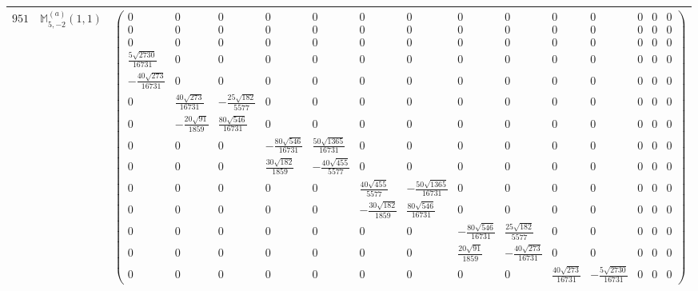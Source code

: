 \documentclass[fleqn,8pt,landscape]{jsarticle}
\begin{document}
\begin{center}
\begin{longtable}{ccc}
$ 951 $ & $ \mathbb{M}_{5,-2}^{(a)}(1,1) $ & $ \begin{pmatrix} 0 & 0 & 0 & 0 & 0 & 0 & 0 & 0 & 0 & 0 & 0 & 0 & 0 & 0 \\ 0 & 0 & 0 & 0 & 0 & 0 & 0 & 0 & 0 & 0 & 0 & 0 & 0 & 0 \\ 0 & 0 & 0 & 0 & 0 & 0 & 0 & 0 & 0 & 0 & 0 & 0 & 0 & 0 \\ \frac{5 \sqrt{2730}}{16731} & 0 & 0 & 0 & 0 & 0 & 0 & 0 & 0 & 0 & 0 & 0 & 0 & 0 \\ - \frac{40 \sqrt{273}}{16731} & 0 & 0 & 0 & 0 & 0 & 0 & 0 & 0 & 0 & 0 & 0 & 0 & 0 \\ 0 & \frac{40 \sqrt{273}}{16731} & - \frac{25 \sqrt{182}}{5577} & 0 & 0 & 0 & 0 & 0 & 0 & 0 & 0 & 0 & 0 & 0 \\ 0 & - \frac{20 \sqrt{91}}{1859} & \frac{80 \sqrt{546}}{16731} & 0 & 0 & 0 & 0 & 0 & 0 & 0 & 0 & 0 & 0 & 0 \\ 0 & 0 & 0 & - \frac{80 \sqrt{546}}{16731} & \frac{50 \sqrt{1365}}{16731} & 0 & 0 & 0 & 0 & 0 & 0 & 0 & 0 & 0 \\ 0 & 0 & 0 & \frac{30 \sqrt{182}}{1859} & - \frac{40 \sqrt{455}}{5577} & 0 & 0 & 0 & 0 & 0 & 0 & 0 & 0 & 0 \\ 0 & 0 & 0 & 0 & 0 & \frac{40 \sqrt{455}}{5577} & - \frac{50 \sqrt{1365}}{16731} & 0 & 0 & 0 & 0 & 0 & 0 & 0 \\ 0 & 0 & 0 & 0 & 0 & - \frac{30 \sqrt{182}}{1859} & \frac{80 \sqrt{546}}{16731} & 0 & 0 & 0 & 0 & 0 & 0 & 0 \\ 0 & 0 & 0 & 0 & 0 & 0 & 0 & - \frac{80 \sqrt{546}}{16731} & \frac{25 \sqrt{182}}{5577} & 0 & 0 & 0 & 0 & 0 \\ 0 & 0 & 0 & 0 & 0 & 0 & 0 & \frac{20 \sqrt{91}}{1859} & - \frac{40 \sqrt{273}}{16731} & 0 & 0 & 0 & 0 & 0 \\ 0 & 0 & 0 & 0 & 0 & 0 & 0 & 0 & 0 & \frac{40 \sqrt{273}}{16731} & - \frac{5 \sqrt{2730}}{16731} & 0 & 0 & 0 \end{pmatrix} $ \\ \hline

\end{longtable}
\end{center}
\end{document}

